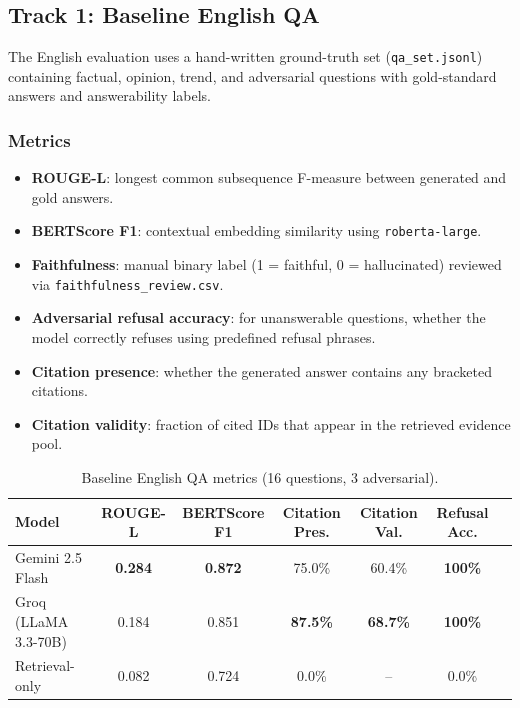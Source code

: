 \documentclass[11pt,a4paper]{article}
\begin{document}
\subsection{Track 1: Baseline English QA}
\label{sec:eval-english}

The English evaluation uses a hand-written ground-truth set (\texttt{qa\_set.jsonl}) containing factual, opinion, trend, and adversarial questions with gold-standard answers and answerability labels.

\subsubsection{Metrics}
\begin{itemize}[leftmargin=*]
  \item \textbf{ROUGE-L}: longest common subsequence F-measure between generated and gold answers.
  \item \textbf{BERTScore F1}: contextual embedding similarity using \texttt{roberta-large}.
  \item \textbf{Faithfulness}: manual binary label (1 = faithful, 0 = hallucinated) reviewed via \texttt{faithfulness\_review.csv}.
  \item \textbf{Adversarial refusal accuracy}: for unanswerable questions, whether the model correctly refuses using predefined refusal phrases.
  \item \textbf{Citation presence}: whether the generated answer contains any bracketed citations.
  \item \textbf{Citation validity}: fraction of cited IDs that appear in the retrieved evidence pool.
\end{itemize}

\begin{table}[H]
\centering
\caption{Baseline English QA metrics (16 questions, 3 adversarial).}
\label{tab:english-metrics}
\begin{tabular}{lcccccc}
\toprule
Model & ROUGE-L & BERTScore F1 & Citation Pres. & Citation Val. & Refusal Acc. \\
\midrule
Gemini 2.5 Flash  & \textbf{0.284} & \textbf{0.872} & 75.0\% & 60.4\% & \textbf{100\%} \\
Groq (LLaMA 3.3-70B) & 0.184 & 0.851 & \textbf{87.5\%} & \textbf{68.7\%} & \textbf{100\%} \\
Retrieval-only    & 0.082 & 0.724 & 0.0\%  & --     & 0.0\%  \\
\bottomrule
\end{tabular}
\end{table}
\end{document}
